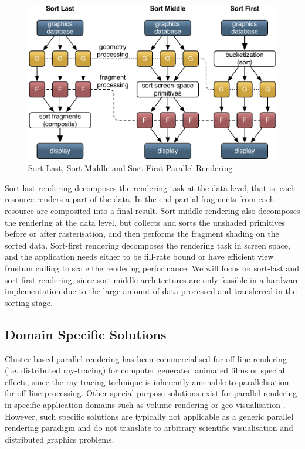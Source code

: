 \begin{figure}[h!t]\center
 \includegraphics[width=\textwidth]{images/all_sorts}%
 \caption{Sort-Last, Sort-Middle and Sort-First Parallel Rendering\label{fSorts}}
\end{figure}

Sort-last rendering decomposes the rendering task at the data level, that is,
each resource renders a part of the data. In the end partial fragments from
each resource are composited into a final result. Sort-middle rendering
also decomposes the rendering at the data level, but collects and sorts the
unshaded primitives before or after rasterisation, and then performs the
fragment shading on the sorted data. Sort-first rendering decomposes the
rendering task in screen space, and the application needs either to be
fill-rate bound or have efficient view frustum culling to scale the rendering
performance. We will focus on sort-last and sort-first rendering, since
sort-middle architectures are only feasible in a hardware implementation due to
the large amount of data processed and transferred in the sorting stage.


\subsection{Domain Specific Solutions}

Cluster-based parallel rendering has been commercialised for off-line rendering
(i.e. distributed ray-tracing) for computer generated animated films or special
effects, since the ray-tracing technique is inherently amenable to
parallelisation for off-line processing. Other special purpose solutions exist
for parallel rendering in specific application domains such as volume rendering
\cite{LWMT:97,Wittenbrink:98,HSCSM:00,SL:02,GS:02,NSJLYZ:05} or
geo-visualisation \cite{VR:91,AG:95,LDC:96,JLMV:06}. However, such specific
solutions are typically not applicable as a generic parallel rendering paradigm
and do not translate to arbitrary scientific visualisation and distributed
graphics problems.

